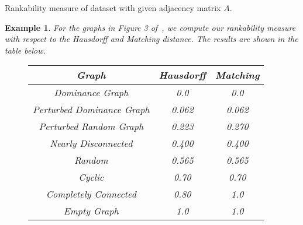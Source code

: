 \documentclass{article}
\newlength\myindent
\newcommand\bindent{%
  \begingroup
  \setlength{\itemindent}{\myindent}
  \addtolength{\algorithmicindent}{\myindent}
}
\newcommand\eindent{\endgroup}
\newtheorem{example}[theorem]{Example}
\begin{document}
\begin{algorithm}
\caption{Rankability measure of dataset with given adjacency matrix $A$.}
\label{alg:twosum}
\begin{algorithmic}
\bindent
{}
\eindent
\end{algorithmic}
\end{algorithm}

\begin{example}
For the graphs in Figure 3 of~\cite{Anderson2018}, we compute our rankability measure with respect to the Hausdorff and Matching distance.
The results are shown in the table below. 

\begin{figure}[h]
\centering
\begin{tabular}{|| c | c | c ||}
\hline
Graph & Hausdorff & Matching \\
\hline\hline
Dominance Graph & 0.0 & 0.0 \\
\hline
Perturbed Dominance Graph & 0.062 & 0.062 \\
\hline
Perturbed Random Graph & 0.223 & 0.270 \\
\hline
Nearly Disconnected & 0.400 & 0.400 \\
\hline
Random & 0.565 & 0.565 \\
\hline
Cyclic & 0.70 & 0.70 \\
\hline
Completely Connected & 0.80 & 1.0 \\
\hline
Empty Graph & 1.0 & 1.0 \\
\hline
\end{tabular}
\end{figure}
\end{example}



\end{document}
